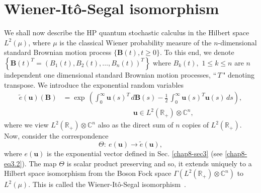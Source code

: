 \section{Wiener-It\^{o}-Segal isomorphism}\label{chap8-sec5}

We shall now describe the HP quantum stochastic calculus in the Hilbert space $L^2(\mu)$, where $\mu$ is the classical Wiener  probability measure of the $n$-dimensional standard Brownian motion process $\{\mathbf{B}(t), t\geq 0\}$. To this end, we denote 
$\left\{\mathbf{B}(t)^T=\left(B_1(t), B_2(t),\ldots , B_n(t)\right)^T\right\}$ where $B_k(t),$ $1\leq k\leq n$ are $n$ independent one dimensional standard Brownian motion processes, ``$\,T\,$" denoting transpose. We introduce the exponential random variables 
\begin{align} 
\widetilde{e}(\mathbf{u})(\mathbf{B})& = {\exp}\,\left( \int_0^\infty \mathbf{u}(s)^T\, d\mathbf{B}(s)- 
\frac{1}{2}\,\int_0^\infty \mathbf{u}(s)^T\mathbf{u}(s)\, ds\right),\nonumber \\ 
& \qquad \qquad \qquad \qquad \qquad \mathbf{u}\in L^2(\mathbb{R}_+)\otimes\mathbb{C}^n, \label{chap8-eq5.1}
\end{align}         
where we view $L^2(\mathbb{R}_+)\otimes \mathbb{C}^n$ also as the direct sum of $n$ copies of $L^2(\mathbb{R}_+).$  
Now, consider the correspondence 
$$
\Theta :\ e(\mathbf{u}) \rightarrow \widetilde{e}(\mathbf{u}),
$$
where $e(\mathbf{u})$ is the exponential vector  defined in Sec. \ref{chap8-sec3} (see \eqref{chap8-eq3.2}). The map $\Theta$ is scalar product preserving and so, it extends uniquely to a Hilbert space isomorphism from the Boson Fock space $\Gamma(L^2(\mathbb{R}_+)\otimes\mathbb{C}^n)$ to  $L^2(\mu)$. This is called the Wiener-It\^{o}-Segal isomorphism~\cite{chap8-key32,chap8-key33,chap8-key34}. 

